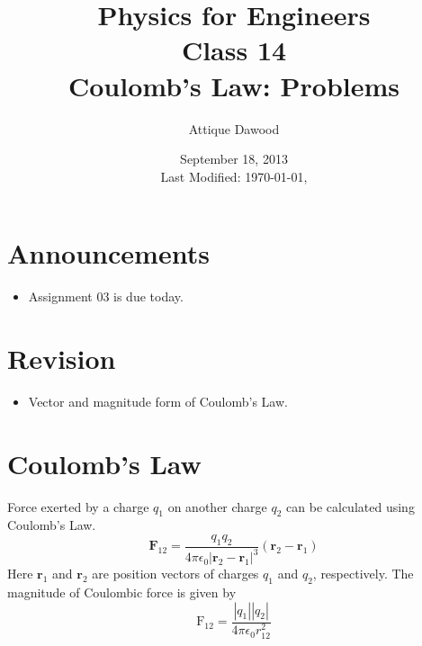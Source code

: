 \documentclass[12pt,a4paper]{article}
\title{\vspace{-2cm}Physics for Engineers\\Class 14\\Coulomb's Law: Problems}
\author{Attique Dawood}
\date{September 18, 2013\\[0.2cm] Last Modified: \today, \currenttime}
\begin{document}
\maketitle
\section{Announcements}
\begin{itemize}
\item Assignment 03 is due today.
\end{itemize}
\section{Revision}
\begin{itemize}
\item Vector and magnitude form of Coulomb's Law.
\end{itemize}
\section{Coulomb's Law}
Force exerted by a charge $q_1$ on another charge $q_2$ can be calculated using Coulomb's Law.
\begin{equation}
\textbf{F}_{12}=\dfrac{q_1q_2}{4\pi\epsilon_0 |\textbf{r}_2-\textbf{r}_1|^3}(\textbf{r}_2-\textbf{r}_1)
\end{equation}
Here $\textbf{r}_1$ and $\textbf{r}_2$ are position vectors of charges $q_1$ and $q_2$, respectively.
The magnitude of Coulombic force is given by
\begin{equation}
\mathrm{F}_{12}=\dfrac{|q_1||q_2|}{4\pi\epsilon_0r_{12}^2}
\end{equation}
\newpage
\end{document}
